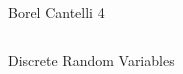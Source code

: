 \documentclass[20pt,xcolor={dvipsnames}]{beamer}
\begin{document}
\begin{frame}

\vspace{-1cm}
\hspace{-0.5cm}
\Huge Borel Cantelli 4

\vspace{1cm}

\begin{columns}

Discrete Random Variables

\hspace*{-1.5cm}\vbox{}

\end{columns}

\end{frame}
\end{document}
